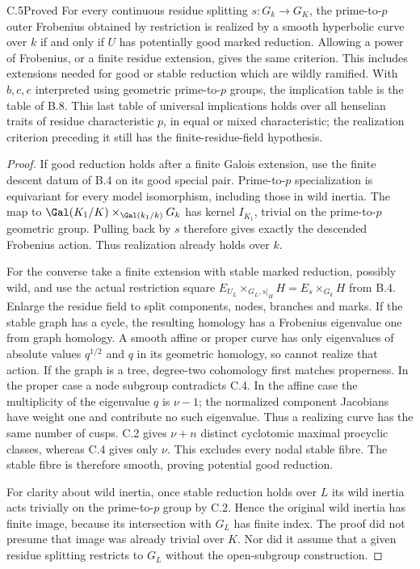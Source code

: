 \begin{claim}{C.5}{Proved}
For every continuous residue splitting $s:G_k\to G_K$, the prime-to-$p$
outer Frobenius obtained by restriction is realized by a smooth hyperbolic
curve over $k$ if and only if $U$ has potentially good marked reduction.
Allowing a power of Frobenius, or a finite residue extension, gives the same
criterion. This includes extensions needed for good or stable reduction
which are wildly ramified. With $b,c,e$ interpreted using geometric
prime-to-$p$ groups, the implication table is the table of B.8. This last
table of universal implications holds over all henselian traits of residue
characteristic $p$, in equal or mixed characteristic; the realization
criterion preceding it still has the finite-residue-field hypothesis.
\end{claim}
\begin{proof}
If good reduction holds after a finite Galois extension, use the finite
descent datum of B.4 on its good special pair. Prime-to-$p$ specialization
is equivariant for every model isomorphism, including those in wild inertia.
The map to
$\Gal(K_1/K)\times_{\Gal(k_1/k)}G_k$ has kernel $I_{K_1}$, trivial on
the prime-to-$p$ geometric group. Pulling back by $s$ therefore gives
exactly the descended Frobenius action. Thus realization already holds
over $k$.

For the converse take a finite extension with stable marked reduction,
possibly wild, and use the actual restriction square
$E_{U_L}\times_{G_L,s|_H}H=E_s\times_{G_k}H$ from B.4. Enlarge the
residue field to split components, nodes, branches and marks. If the stable
graph has a cycle, the resulting homology has a Frobenius eigenvalue one
from graph homology. A smooth affine or proper curve has only eigenvalues
of absolute values $q^{1/2}$ and $q$ in its geometric homology, so cannot
realize that action. If the graph is a tree, degree-two cohomology first
matches properness. In the proper case a node subgroup contradicts C.4.
In the affine case the multiplicity of the eigenvalue $q$ is $\nu-1$;
the normalized component Jacobians have weight one and contribute no such
eigenvalue. Thus a realizing curve has the same number of cusps. C.2 gives
$\nu+n$ distinct cyclotomic maximal procyclic classes, whereas C.4 gives
only $\nu$. This excludes every nodal stable fibre. The stable fibre is
therefore smooth, proving potential good reduction.

For clarity about wild inertia, once stable reduction holds over $L$ its
wild inertia acts trivially on the prime-to-$p$ group by C.2. Hence the
original wild inertia has finite image, because its intersection with
$G_L$ has finite index. The proof did not presume that image was already
trivial over $K$. Nor did it assume that a given residue splitting restricts
to $G_L$ without the open-subgroup construction.


\end{proof}
